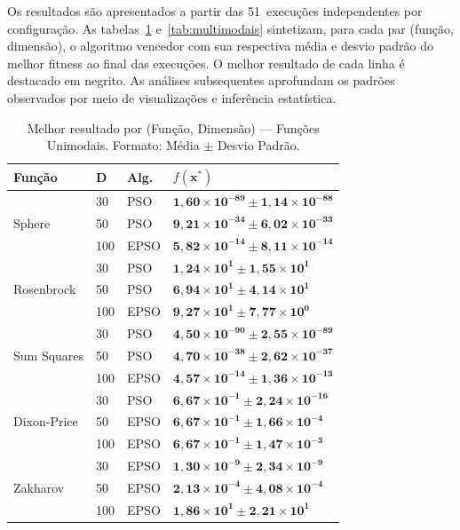 \documentclass[runningheads]{llncs}
\begin{document}
Os resultados são apresentados a partir das 51~execuções independentes
por configuração. As tabelas~\ref{tab:unimodais} e~\ref{tab:multimodais}
sintetizam, para cada par (função, dimensão), o algoritmo vencedor com
sua respectiva média e desvio padrão do melhor fitness ao final das
execuções. O melhor resultado de cada linha é destacado em negrito.
As análises subsequentes aprofundam os padrões observados por meio
de visualizações e inferência estatística.

\begin{table}[H]
\caption{Melhor resultado por (Função, Dimensão) — Funções Unimodais.
Formato: Média $\pm$ Desvio Padrão.}
\label{tab:unimodais}
\centering
\scriptsize
\begin{tabular}{llll}
\toprule
\textbf{Função} & \textbf{D} & \textbf{Alg.} & $f(\mathbf{x}^*)$ \\
\midrule
\multirow{3}{*}{Sphere}
  & 30  & PSO  & $\mathbf{1{,}60 \times 10^{-89} \pm 1{,}14 \times 10^{-88}}$ \\
  & 50  & PSO  & $\mathbf{9{,}21 \times 10^{-34} \pm 6{,}02 \times 10^{-33}}$ \\
  & 100 & EPSO & $\mathbf{5{,}82 \times 10^{-14} \pm 8{,}11 \times 10^{-14}}$ \\
\midrule
\multirow{3}{*}{Rosenbrock}
  & 30  & PSO  & $\mathbf{1{,}24 \times 10^{1} \pm 1{,}55 \times 10^{1}}$ \\
  & 50  & PSO  & $\mathbf{6{,}94 \times 10^{1} \pm 4{,}14 \times 10^{1}}$ \\
  & 100 & EPSO & $\mathbf{9{,}27 \times 10^{1} \pm 7{,}77 \times 10^{0}}$ \\
\midrule
\multirow{3}{*}{Sum Squares}
  & 30  & PSO  & $\mathbf{4{,}50 \times 10^{-90} \pm 2{,}55 \times 10^{-89}}$ \\
  & 50  & PSO  & $\mathbf{4{,}70 \times 10^{-38} \pm 2{,}62 \times 10^{-37}}$ \\
  & 100 & EPSO & $\mathbf{4{,}57 \times 10^{-14} \pm 1{,}36 \times 10^{-13}}$ \\
\midrule
\multirow{3}{*}{Dixon-Price}
  & 30  & PSO  & $\mathbf{6{,}67 \times 10^{-1} \pm 2{,}24 \times 10^{-16}}$ \\
  & 50  & EPSO & $\mathbf{6{,}67 \times 10^{-1} \pm 1{,}66 \times 10^{-4}}$ \\
  & 100 & EPSO & $\mathbf{6{,}67 \times 10^{-1} \pm 1{,}47 \times 10^{-3}}$ \\
\midrule
\multirow{3}{*}{Zakharov}
  & 30  & EPSO & $\mathbf{1{,}30 \times 10^{-9} \pm 2{,}34 \times 10^{-9}}$ \\
  & 50  & EPSO & $\mathbf{2{,}13 \times 10^{-4} \pm 4{,}08 \times 10^{-4}}$ \\
  & 100 & EPSO & $\mathbf{1{,}86 \times 10^{1} \pm 2{,}21 \times 10^{1}}$ \\
\bottomrule
\end{tabular}
\end{table}
\end{document}
